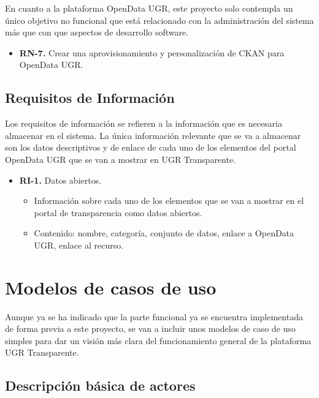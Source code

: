 En cuanto a la plataforma OpenData UGR, este proyecto solo contempla un único objetivo no funcional que está relacionado con
la administración del sistema más que con que aspectos de desarrollo software.

\begin{itemize}
  \item \textbf{RN-7.} Crear una aprovisionamiento y personalización de CKAN para OpenData UGR.
\end{itemize}

\subsection{Requisitos de Información}

Los requisitos de información se refieren a la información que es necesaria almacenar en el sistema. La única información 
relevante que se va a almacenar son los datos descriptivos y de enlace de cada uno de los elementos del portal OpenData UGR 
que se van a mostrar en UGR Transparente.

\begin{itemize}
  \item \textbf{RI-1.} Datos abiertos.
  \begin{itemize}
    \item Información sobre cada uno de los elementos que se van a mostrar en el portal de transparencia como datos abiertos.
    \item Contenido: nombre, categoría, conjunto de datos, enlace a OpenData UGR, enlace al recurso.
  \end{itemize}
\end{itemize}

\section{Modelos de casos de uso}

Aunque ya se ha indicado que la parte funcional ya se encuentra implementada de forma previa a este proyecto, se van a incluir
unos modelos de caso de uso simples para dar un visión más clara del funcionamiento general de la plataforma UGR Transparente.

\subsection{Descripción básica de actores}


